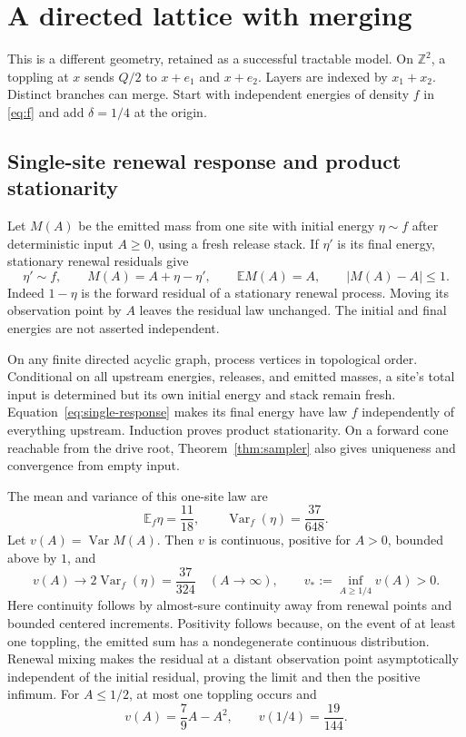 \documentclass[11pt]{article}
\numberwithin{equation}{section}
\theoremstyle{definition}
\newcommand{\E}{\mathbb E}
\newcommand{\Z}{\mathbb Z}
\newcommand{\Var}{\operatorname{Var}}
\begin{document}
\section{A directed lattice with merging}\label{sec:directed}

This is a different geometry, retained as a successful tractable model. On $\Z^2$, a toppling at $x$ sends $Q/2$ to $x+e_1$ and $x+e_2$. Layers are indexed by $x_1+x_2$. Distinct branches can merge. Start with independent energies of density $f$ in \eqref{eq:f} and add $\delta=1/4$ at the origin.

\subsection{Single-site renewal response and product stationarity}
Let $M(A)$ be the emitted mass from one site with initial energy $\eta\sim f$ after deterministic input $A\ge0$, using a fresh release stack. If $\eta'$ is its final energy, stationary renewal residuals give
\begin{equation}\label{eq:single-response}
 \eta'\sim f,\qquad M(A)=A+\eta-\eta',\qquad
 \E M(A)=A,\qquad |M(A)-A|\le1.
\end{equation}
Indeed $1-\eta$ is the forward residual of a stationary renewal process. Moving its observation point by $A$ leaves the residual law unchanged. The initial and final energies are not asserted independent.

On any finite directed acyclic graph, process vertices in topological order. Conditional on all upstream energies, releases, and emitted masses, a site's total input is determined but its own initial energy and stack remain fresh. Equation~\eqref{eq:single-response} makes its final energy have law $f$ independently of everything upstream. Induction proves product stationarity. On a forward cone reachable from the drive root, Theorem~\ref{thm:sampler} also gives uniqueness and convergence from empty input.

The mean and variance of this one-site law are
\[
 \E_f\eta=\frac{11}{18},\qquad \Var_f(\eta)=\frac{37}{648}.
\]
Let $v(A)=\Var M(A)$. Then $v$ is continuous, positive for $A>0$, bounded above by $1$, and
\begin{equation}\label{eq:variance-floor}
 v(A)\longrightarrow2\Var_f(\eta)=\frac{37}{324}\quad(A\to\infty),
 \qquad v_*:=\inf_{A\ge1/4}v(A)>0.
\end{equation}
Here continuity follows by almost-sure continuity away from renewal points and bounded centered increments. Positivity follows because, on the event of at least one toppling, the emitted sum has a nondegenerate continuous distribution. Renewal mixing makes the residual at a distant observation point asymptotically independent of the initial residual, proving the limit and then the positive infimum. For $A\le1/2$, at most one toppling occurs and
\[
 v(A)=\frac79 A-A^2,\qquad v(1/4)=\frac{19}{144}.
\]
\end{document}
